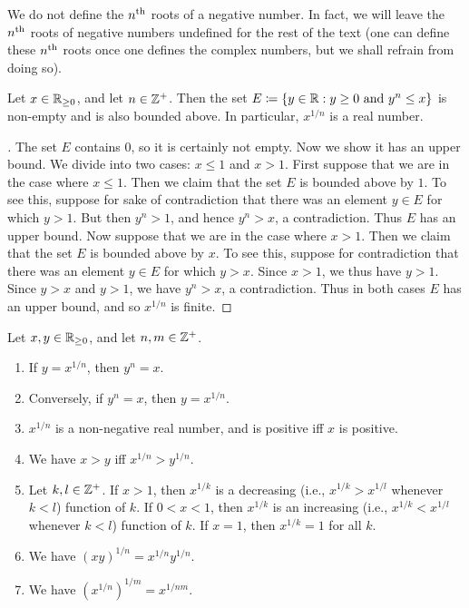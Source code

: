 \begin{note}
  We do not define the \(n^{\operatorname{th}}\) roots of a negative number.
  In fact, we will leave the \(n^{\operatorname{th}}\) roots of negative numbers undefined for the rest of the text
  (one can define these \(n^{\operatorname{th}}\) roots once one defines the complex numbers, but we shall refrain from doing so).
\end{note}

\begin{lem}\label{i:5.6.5}
  Let \(x \in \mathbb{R}_{\geq 0}\), and let \(n \in \mathbb{Z}^+\).
  Then the set \(E \coloneqq \left\lbrace y \in \mathbb{R} : y \geq 0 \text{ and } y^n \leq x\right\rbrace\) is non-empty and is also bounded above.
  In particular, \(x^{1 / n}\) is a real number.
\end{lem}

\begin{proof}[]
  The set \(E\) contains \(0\), so it is certainly not empty.
  Now we show it has an upper bound.
  We divide into two cases: \(x \leq 1\) and \(x > 1\).
  First suppose that we are in the case where \(x \leq 1\).
  Then we claim that the set \(E\) is bounded above by \(1\).
  To see this, suppose for sake of contradiction that there was an element \(y \in E\) for which \(y > 1\).
  But then \(y^n > 1\), and hence \(y^n > x\), a contradiction.
  Thus \(E\) has an upper bound.
  Now suppose that we are in the case where \(x > 1\).
  Then we claim that the set \(E\) is bounded above by \(x\).
  To see this, suppose for contradiction that there was an element \(y \in E\) for which \(y > x\).
  Since \(x > 1\), we thus have \(y > 1\).
  Since \(y > x\) and \(y > 1\), we have \(y^n > x\), a contradiction.
  Thus in both cases \(E\) has an upper bound, and so \(x^{1 / n}\) is finite.
\end{proof}

\begin{lem}\label{i:5.6.6}
  Let \(x, y \in \mathbb{R}_{\geq 0}\), and let \(n, m \in \mathbb{Z}^+\).
  \begin{enumerate}
    \item If \(y = x^{1 / n}\), then \(y^n = x\).
    \item Conversely, if \(y^n = x\), then \(y = x^{1 / n}\).
    \item \(x^{1 / n}\) is a non-negative real number, and is positive iff \(x\) is positive.
    \item We have \(x > y\) iff \(x^{1 / n} > y^{1 / n}\).
    \item Let \(k, l \in \mathbb{Z}^+\).
          If \(x > 1\), then \(x^{1 / k}\) is a decreasing (i.e., \(x^{1 / k} > x^{1 / l}\) whenever \(k < l\)) function of \(k\).
          If \(0 < x < 1\), then \(x^{1 / k}\) is an increasing (i.e., \(x^{1 / k} < x^{1 / l}\) whenever \(k < l\)) function of \(k\).
          If \(x = 1\), then \(x^{1 / k} = 1\) for all \(k\).
    \item We have \((xy)^{1 / n} = x^{1 / n} y^{1 / n}\).
    \item We have \((x^{1 / n})^{1 / m} = x^{1 / nm}\).
  \end{enumerate}
\end{lem}

